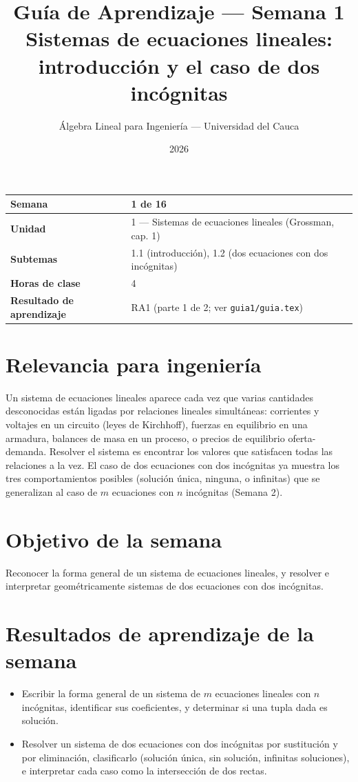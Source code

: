 \documentclass[11pt,letterpaper]{article}
\title{\textcolor{unicaucaverde}{\Large Guía de Aprendizaje — Semana 1}\\[4pt]
  \large Sistemas de ecuaciones lineales: introducción y el caso de dos incógnitas}
\author{Álgebra Lineal para Ingeniería --- Universidad del Cauca}
\date{2026}
\begin{document}
\maketitle

\begin{center}
\begin{tabular}{|>{\bfseries}p{4cm}|p{10cm}|}
\hline
Semana & 1 de 16 \\ \hline
Unidad & 1 --- Sistemas de ecuaciones lineales (Grossman, cap. 1) \\ \hline
Subtemas & 1.1 (introducción), 1.2 (dos ecuaciones con dos incógnitas) \\ \hline
Horas de clase & 4 \\ \hline
Resultado de aprendizaje & RA1 (parte 1 de 2; ver \texttt{guia1/guia.tex}) \\ \hline
\end{tabular}
\end{center}

\section*{Relevancia para ingeniería}

Un sistema de ecuaciones lineales aparece cada vez que varias cantidades desconocidas están
ligadas por relaciones lineales simultáneas: corrientes y voltajes en un circuito (leyes de
Kirchhoff), fuerzas en equilibrio en una armadura, balances de masa en un proceso, o precios de
equilibrio oferta-demanda. Resolver el sistema es encontrar los valores que satisfacen todas las
relaciones a la vez. El caso de dos ecuaciones con dos incógnitas ya muestra los tres
comportamientos posibles (solución única, ninguna, o infinitas) que se generalizan al caso de
$m$ ecuaciones con $n$ incógnitas (Semana 2).

\section{Objetivo de la semana}

Reconocer la forma general de un sistema de ecuaciones lineales, y resolver e interpretar
geométricamente sistemas de dos ecuaciones con dos incógnitas.

\section{Resultados de aprendizaje de la semana}

\begin{itemize}[leftmargin=1.2cm]
  \item[\textbf{RA1.1.}] Escribir la forma general de un sistema de $m$ ecuaciones lineales con
        $n$ incógnitas, identificar sus coeficientes, y determinar si una tupla dada es solución.
  \item[\textbf{RA1.2.}] Resolver un sistema de dos ecuaciones con dos incógnitas por sustitución
        y por eliminación, clasificarlo (solución única, sin solución, infinitas soluciones), e
        interpretar cada caso como la intersección de dos rectas.
\end{itemize}
\end{document}
